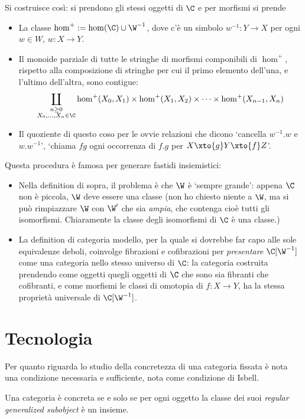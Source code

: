 \documentclass[10pt,a4paper]{amsart}
\begin{document}
Si costruisce così: si prendono gli stessi oggetti di $\C$ e per morfismi si prende
\begin{itemize}
\item La classe $\hom^+ := \hom(\C)\cup \W^{-1}$, dove c'è un simbolo $w^{-1} \colon Y \to X$ per ogni $w\in W$, $w\colon X \to Y$.
\item Il monoide parziale di tutte le stringhe di morfismi componibili di $\hom^+$, rispetto alla composizione di stringhe per cui il primo elemento dell'una, e l'ultimo dell'altra, sono contigue:
\[
\coprod_{\substack{n\ge 0 \\ X_0,\dots, X_n\in \C}} \hom^+(X_0, X_1)\times \hom^+(X_1, X_2) \times\dots\times \hom^+(X_{n-1}, X_n)
\]
\item Il quoziente di questo coso per le ovvie relazioni che dicono `cancella $w^{-1}.w$ e $w.w^{-1}$', `chiama $fg$ ogni occorrenza di $f.g$ per $X \xto{g} Y \xto{f} Z$'.
\end{itemize}
Questa procedura è famosa per generare fastidi insiemistici:
\begin{itemize}
\item Nella definition di sopra, il problema è che $\W$ è `sempre grande': appena $\C$ non è piccola, $\W$ deve essere una classe (non ho chiesto niente a $\W$, ma si può rimpiazzare $\W$ con $\W'$ che sia \emph{ampia}, che contenga cioè tutti gli isomorfismi. Chiaramente la classe degli isomorfismi di $\C$ è una classe.)
\item La definition di categoria modello, per la quale si dovrebbe far capo alle sole equivalenze deboli, coinvolge fibrazioni e cofibrazioni per \emph{presentare} $\C[\W^{-1}]$ come una categoria nello stesso universo di $\C$: la categoria costruita prendendo come oggetti quegli oggetti di $\C$ che sono sia fibranti che cofibranti, e come morfismi le classi di omotopia di $f \colon X\to Y$, ha la stessa proprietà universale di $\C[\W^{-1}]$.
\end{itemize}


\section{Tecnologia}

Per quanto riguarda lo studio della concretezza di una categoria fissata è nota una condizione necessaria e sufficiente, nota come condizione di Isbell.

\begin{lemma} Una categoria  è concreta se e solo se per ogni oggetto la classe dei suoi \textit{regular generalized subobject} è un insieme.
\end{lemma}
\end{document}
